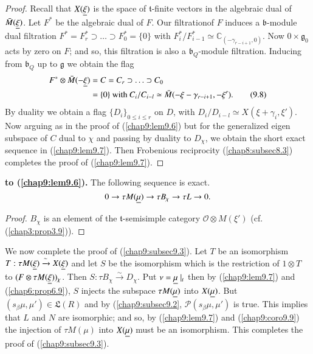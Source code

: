 \begin{proof}
Recall that $X(\underline{\xi})$ is the space of $\mathfrak{t}$-finite vectors
in the algebraic dual of $\bar{M}(\underline{\xi})$. Let $F^*$ be the
algebraic dual of $F$. Our filtration\pageoriginale of $F$ induces a
$\mathfrak{b}$-module dual filtration $F^* = F^*_r \supset \ldots
\supset F^*_0 = \{0\}$ with $F^*_i / F^*_{i-1} \simeq
\mathbb{C}_{(-\gamma_{r-i+1}, 0)}$. Now $0 \times \mathfrak{g}_0$ acts
by zero on $F$; and so, this filtration is also a
$\mathfrak{b}_Q$-module filtration. Inducing from $\mathfrak{b}_Q$ up
to $\mathfrak{g}$ we obtain the flag 
\begin{align*}
F^* \otimes \bar{M} (-\underline{\xi}) &= C = C_r \supset \ldots \supset
C_0\\ 
&=\{0\} \text{ with } C_i / C_{i-l} \simeq \bar{M} (-\xi -\gamma_{r-i +
  1}, -\xi').  \tag{9.8}\label{eq9.8}
\end{align*}
By duality we obtain a flag $\{D_i\}_{0\leq i \leq r}$ on $D$, with
$D_i / D_{i-l} \simeq X(\xi + \gamma_i , \xi')$. Now arguing as in the
proof of (\ref{chap9:lem9.6}) but for the generalized eigen subspace
of $C$ dual to 
$\chi$ and passing by duality to $D_\chi$, we obtain the short exact
sequence in (\ref{chap9:lem9.7}). Then Frobenious reciprocity
(\ref{chap8:subsec8.3}) completes the 
proof of (\ref{chap9:lem9.7}). 
\end{proof}

\setcounter{prop}{8}
\begin{coro}\label{chap9:coro9.9}
{\bf to (\ref{chap9:lem9.6}).} The following sequence is exact.
$$
0 \to \tau M(\underline{\mu}) \to \tau B_\chi \to \tau L \to 0. 
$$
\end{coro}

\begin{proof}
$B_\chi$ is an element of the $\mathfrak{t}$-semisimple category
  $\mathscr{O} \otimes M(\xi')$ (cf. (\ref{chap3:prop3.9})). 
\end{proof}

We now complete the proof of (\ref{chap9:subsec9.3}). Let $T$ be an
isomorphism $T: \tau 
M(\underline{\xi}) \xrightarrow{\sim} X(\underline{\xi})$ and let $S$ be the
isomorphism which is the restriction of $1 \otimes T$ to $(F\otimes
\tau M (\underline{\xi}))_\chi$. Then $S: \tau B_\chi \xrightarrow{\sim}
D_\chi$. Put $\nu = \underline{\mu} \mid_t$ then by (\ref{chap9:lem9.7}) and
(\ref{chap6:prop6.9}), $S$ 
injects the subspace $\tau M(\underline{\mu})$ into $X(\underline{\mu})$. But
$(s_\beta \mu, \mu') \in \mathfrak{L} (R)$ and by
(\ref{chap9:subsec9.2}, $\mathscr{P} 
(s_\beta \mu, \mu')$ is true. This implies that $L$ and $N$ are
isomorphic; and so, by (\ref{chap9:lem9.7}) and
(\ref{chap9:coro9.9}) the injection of $\tau M(\mu)$ 
into $X(\underline{\mu})$ must be an isomorphism. This completes the proof of
(\ref{chap9:subsec9.3}). 

